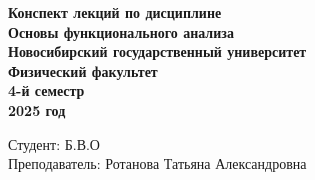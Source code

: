 \documentclass[12pt, a4paper,oneside]{book}
\begin{document}
\begin{titlepage}
    \thispagestyle{empty}  %
    \centering
    \vspace*{1cm}  %

    \textbf{\huge Конспект лекций по дисциплине}  \\[1.5cm]  %
    \textbf{\huge Основы функционального анализа}  \\[2cm]   %
    \textbf{\Large Новосибирский государственный университет} \\[0.5cm]
    \textbf{\large Физический факультет} \\[0.5cm]
    \textbf{\large 4-й семестр} \\[0.5cm]
    \textbf{\large 2025 год} \\[10cm]

    \begin{flushright}
        \large Студент: Б.В.О \\[0.5cm]  %
        Преподаватель: Ротанова Татьяна Александровна  %
    \end{flushright}
\end{titlepage}

\tableofcontents  %

\def\mainfile{}  %




\end{document}
